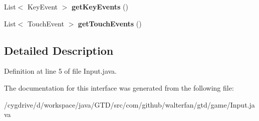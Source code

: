 \begin{DoxyCompactItemize}
\item 
\hypertarget{interfacecom_1_1github_1_1walterfan_1_1gtd_1_1game_1_1Input_ad9593e512b94ae9d6b109f8f06acaf94}{List$<$ Key\-Event $>$ {\bfseries get\-Key\-Events} ()}\label{interfacecom_1_1github_1_1walterfan_1_1gtd_1_1game_1_1Input_ad9593e512b94ae9d6b109f8f06acaf94}

\item 
\hypertarget{interfacecom_1_1github_1_1walterfan_1_1gtd_1_1game_1_1Input_a669f9b065e37388979ac637b6f1fa63a}{List$<$ Touch\-Event $>$ {\bfseries get\-Touch\-Events} ()}\label{interfacecom_1_1github_1_1walterfan_1_1gtd_1_1game_1_1Input_a669f9b065e37388979ac637b6f1fa63a}

\end{DoxyCompactItemize}


\subsection{Detailed Description}


Definition at line 5 of file Input.\-java.



The documentation for this interface was generated from the following file\-:\begin{DoxyCompactItemize}
\item 
/cygdrive/d/workspace/java/\-G\-T\-D/src/com/github/walterfan/gtd/game/Input.\-java\end{DoxyCompactItemize}
